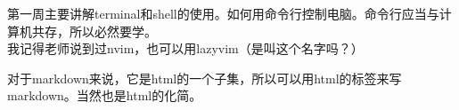 \documentclass{article}
\begin{document}
第一周主要讲解terminal和shell的使用。如何用命令行控制电脑。命令行应当与计算机共存，所以必然要学。\\
我记得老师说到过nvim，也可以用lazyvim（是叫这个名字吗？）

对于markdown来说，它是html的一个子集，所以可以用html的标签来写markdown。当然也是html的化简。\\
\end{document}
